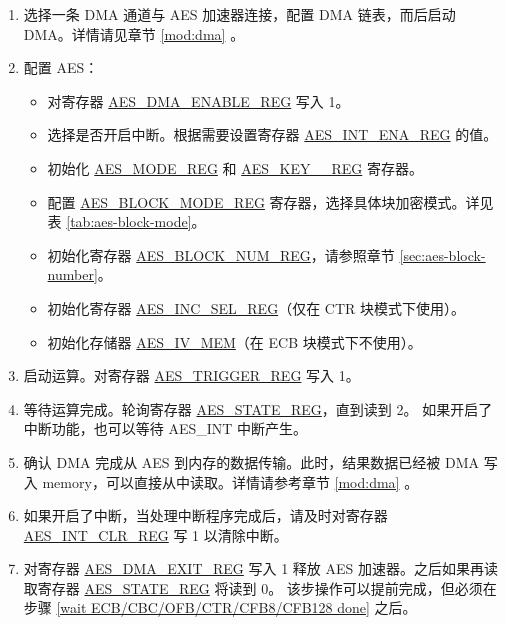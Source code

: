 \documentclass[main\_\_CN.tex]{subfiles}
\begin{document}
\begin{enumerate}
    \item 选择一条 DMA 通道与 AES 加速器连接，配置 DMA 链表，而后启动 DMA。详情请见章节 \ref{mod:dma} \textit{}。
    \item 配置 AES：
    \begin{itemize}
        \item 对寄存器 \hyperref[regdesc:AESDMAENABLEREG]{AES\_DMA\_ENABLE\_REG} 写入 1。
        \item 选择是否开启中断。根据需要设置寄存器 \hyperref[regdesc:AESINTENAREG]{AES\_INT\_ENA\_REG} 的值。
        \item 初始化 \hyperref[regdesc:AESMODEREG]{AES\_MODE\_REG} 和 \hyperref[regdesc:AESKEYnREG]{AES\_KEY\_\_REG} 寄存器。
        \item 配置 \hyperref[regdesc:AESBLOCKMODEREG]{AES\_BLOCK\_MODE\_REG} 寄存器，选择具体块加密模式。详见表 \ref{tab:aes-block-mode}。
        \item 初始化寄存器 \hyperref[regdesc:AESBLOCKNUMREG]{AES\_BLOCK\_NUM\_REG}，请参照章节 \ref{sec:aes-block-number}。
        \item 初始化寄存器 \hyperref[regdesc:AESINCSELREG]{AES\_INC\_SEL\_REG}（仅在 CTR 块模式下使用）。
        \item 初始化存储器 \hyperref[memdesc:AESIVMEM]{AES\_IV\_MEM}（在 ECB 块模式下不使用）。
    \end{itemize}
    \item 启动运算。对寄存器 \hyperref[regdesc:AESTRIGGERREG]{AES\_TRIGGER\_REG} 写入 1。
    \item \label{wait ECB/CBC/OFB/CTR/CFB8/CFB128 done}
            等待运算完成。轮询寄存器 \hyperref[regdesc:AESSTATEREG]{AES\_STATE\_REG}，直到读到 2。
            如果开启了中断功能，也可以等待 AES\_INT 中断产生。
    \item 确认 DMA 完成从 AES 到内存的数据传输。此时，结果数据已经被 DMA 写入 memory，可以直接从中读取。详情请参考章节 \ref{mod:dma} \textit{}。
    \item 如果开启了中断，当处理中断程序完成后，请及时对寄存器 \hyperref[regdesc:AESINTCLRREG]{AES\_INT\_CLR\_REG} 写 1 以清除中断。
    \item 对寄存器 \hyperref[regdesc:AESDMAEXITREG]{AES\_DMA\_EXIT\_REG} 写入 1 释放 AES 加速器。之后如果再读取寄存器 \hyperref[regdesc:AESSTATEREG]{AES\_STATE\_REG} 将读到 0。
    该步操作可以提前完成，但必须在步骤 \ref{wait ECB/CBC/OFB/CTR/CFB8/CFB128 done} 之后。
\end{enumerate}
\end{document}
